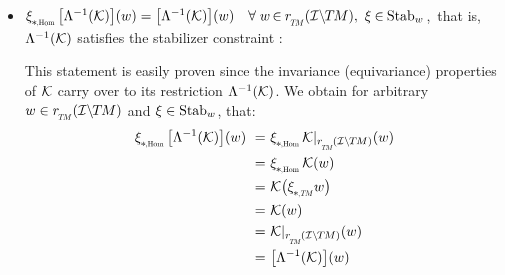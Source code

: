 \begin{itemize}[leftmargin=0cm]
\begin{itemize}[leftmargin=1.1cm]
        \item[\it 2\hspace{1pt}d)]
            $\dxiHom \big[\Lambda^{-1}(\K)\big](w) = \big[\Lambda^{-1}(\K)\big](w) \ \ \
               \forall\; w \mkern-2mu\in\mkern-1mu \rTM(\ITM),\ \xi \mkern-1mu\in\mkern-1mu \Stab{w}$,\ 
            that is, $\Lambda^{-1}(\mathcal{K})$ satisfies the stabilizer constraint :

            This statement is easily proven since the invariance (equivariance) properties of $\mathcal{K}$ carry over to its restriction $\Lambda^{-1}(\mathcal{K})$.
            We obtain for arbitrary $w\in \rTM(\ITM)$ and $\xi\in \operatorname{Stab}_{w}$, that:
            \begin{align}
                \dxiHom \big[\Lambda^{-1}(\K)\big](w)
                \ =&\ \dxiHom \Krestr (w) \notag \\
                \ =&\ \dxiHom \K(w) \notag \\
                \ =&\ \K \big(\dxiTM w\big) \notag \\
                \ =&\ \K(w) \notag \\
                \ =&\ \Krestr(w) \notag \\
                \ =&\ \big[\Lambda^{-1}(\K)\big](w)
            \end{align}

    \end{itemize}











\end{itemize}
